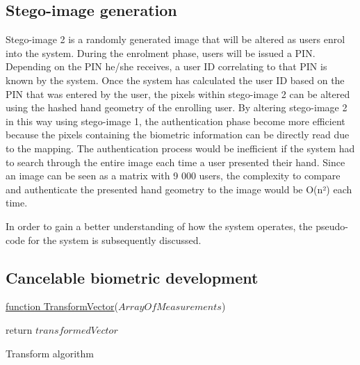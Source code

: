 \subsection{Stego-image generation}

Stego-image 2 is a randomly generated image that will be altered as users enrol into the system. During the enrolment phase, users will be issued a PIN. Depending on the PIN he/she receives, a user ID correlating to that PIN is known by the system. Once the system has calculated the user ID based on the PIN that was entered by the user, the pixels within stego-image 2 can be altered using the hashed hand geometry of the enrolling user. By altering stego-image 2 in this way using stego-image 1, the authentication phase become more efficient because the pixels containing the biometric information can be directly read due to the mapping. The authentication process would be inefficient if the system had to search through the entire image each time a user presented their hand. Since an image can be seen as a matrix with 9 000 users, the complexity to compare and authenticate the presented hand geometry to the image would be O(n²) each time. 

In order to gain a better understanding of how the system operates, the pseudo-code for the system is subsequently discussed.

\subsection{Cancelable biometric development}


\begin{algorithm}
     
     \underline{function TransformVector}($ArrayOfMeasurements$)\;
     
     
     return $transformedVector$\;
     \caption{Transform algorithm}
     \label{alg: Transform algorithm}
     
\end{algorithm}


